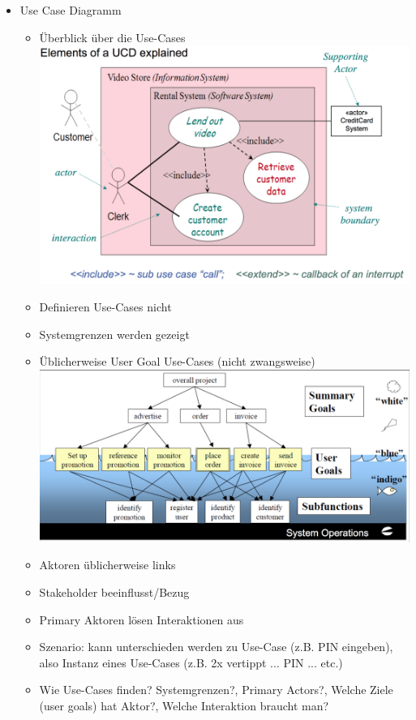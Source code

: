 \documentclass[paper=a4, fontsize=11pt]{scrartcl} %
\numberwithin{equation}{section} %
\numberwithin{figure}{section} %
\numberwithin{table}{section} %
\begin{document}
\begin{itemize}
\begin{itemize}
  \end{itemize}
  \item Use Case Diagramm
  \begin{itemize}
    \item Überblick über die Use-Cases\\
    \includegraphics[width=\linewidth]{imgs/usecasediagram}
    \item Definieren Use-Cases nicht
    \item Systemgrenzen werden gezeigt
    \item Üblicherweise User Goal Use-Cases (nicht zwangsweise)\\
    \includegraphics[width=\linewidth]{imgs/usecaselevels}
    \item Aktoren üblicherweise links
    \item Stakeholder beeinflusst/Bezug
    \item Primary Aktoren lösen Interaktionen aus
    \item Szenario: kann unterschieden werden zu Use-Case (z.B. PIN eingeben), also Instanz eines Use-Cases (z.B. 2x vertippt ... PIN ... etc.)
    \item Wie Use-Cases finden? Systemgrenzen?, Primary Actors?, Welche Ziele (user goals) hat Aktor?, Welche Interaktion braucht man?

\end{itemize}
\end{itemize}
\end{document}
